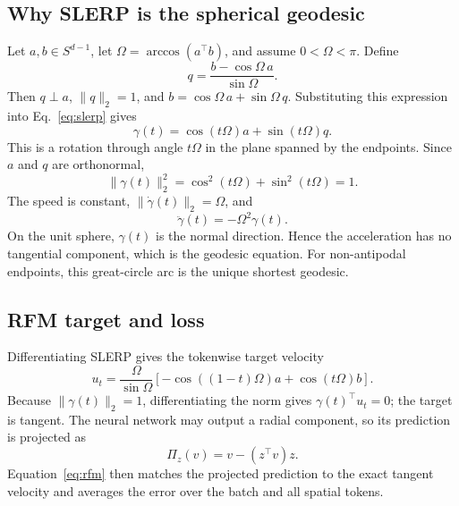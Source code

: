 \documentclass{article}
\begin{document}
\subsection{Why SLERP is the spherical geodesic}
Let $a,b\in S^{d-1}$, let $\Omega=\arccos(a^\top b)$, and assume $0<\Omega<\pi$. Define
\begin{equation}
 q=\frac{b-\cos\Omega\,a}{\sin\Omega}.
\end{equation}
Then $q\perp a$, $\|q\|_2=1$, and $b=\cos\Omega\,a+\sin\Omega\,q$. Substituting this expression into Eq.~\eqref{eq:slerp} gives
\begin{equation}
 \gamma(t)=\cos(t\Omega)a+\sin(t\Omega)q.
\end{equation}
This is a rotation through angle $t\Omega$ in the plane spanned by the endpoints. Since $a$ and $q$ are orthonormal,
\begin{equation}
 \|\gamma(t)\|_2^2=\cos^2(t\Omega)+\sin^2(t\Omega)=1.
\end{equation}
The speed is constant, $\|\dot\gamma(t)\|_2=\Omega$, and
\begin{equation}
 \ddot\gamma(t)=-\Omega^2\gamma(t).
\end{equation}
On the unit sphere, $\gamma(t)$ is the normal direction. Hence the acceleration has no tangential component, which is the geodesic equation. For non-antipodal endpoints, this great-circle arc is the unique shortest geodesic.

\subsection{RFM target and loss}
Differentiating SLERP gives the tokenwise target velocity
\begin{equation}
 u_t=\frac{\Omega}{\sin\Omega}
 \left[-\cos((1-t)\Omega)a+\cos(t\Omega)b\right].
\end{equation}
Because $\|\gamma(t)\|_2=1$, differentiating the norm gives $\gamma(t)^\top u_t=0$; the target is tangent. The neural network may output a radial component, so its prediction is projected as
\begin{equation}
 \Pi_z(v)=v-(z^\top v)z.
\end{equation}
Equation~\eqref{eq:rfm} then matches the projected prediction to the exact tangent velocity and averages the error over the batch and all spatial tokens.
\end{document}
